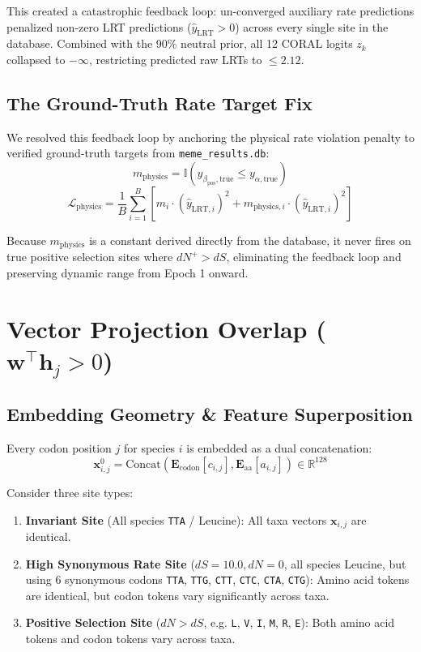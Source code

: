 \documentclass[11pt,a4paper]{article}
\begin{document}
This created a catastrophic feedback loop: un-converged auxiliary rate predictions penalized non-zero LRT predictions ($\hat{y}_{\text{LRT}} > 0$) across every single site in the database. Combined with the 90\% neutral prior, all 12 CORAL logits $z_k$ collapsed to $-\infty$, restricting predicted raw LRTs to $\le 2.12$.

\subsection{The Ground-Truth Rate Target Fix}
We resolved this feedback loop by anchoring the physical rate violation penalty to verified ground-truth targets from \texttt{meme_results.db}:
\begin{equation}
m_{\text{physics}} = \mathbb{I}\left(y_{\beta_{\text{pos}}, \text{true}} \le y_{\alpha, \text{true}}\right)
\end{equation}
\begin{equation}
\mathcal{L}_{\text{physics}} = \frac{1}{B} \sum_{i=1}^B \left[ m_i \cdot (\hat{y}_{\text{LRT}, i})^2 + m_{\text{physics}, i} \cdot (\hat{y}_{\text{LRT}, i})^2 \right]
\end{equation}

Because $m_{\text{physics}}$ is a constant derived directly from the database, it never fires on true positive selection sites where $dN^+ > dS$, eliminating the feedback loop and preserving dynamic range from Epoch 1 onward.

\section{Vector Projection Overlap ($\mathbf{w}^\top \mathbf{h}_j > 0$)}

\subsection{Embedding Geometry & Feature Superposition}
Every codon position $j$ for species $i$ is embedded as a dual concatenation:
\begin{equation}
\mathbf{x}_{i,j}^0 = \text{Concat}\left(\mathbf{E}_{\text{codon}}[c_{i,j}], \mathbf{E}_{\text{aa}}[a_{i,j}]\right) \in \mathbb{R}^{128}
\end{equation}

Consider three site types:
\begin{enumerate}
    \item \textbf{Invariant Site} (All species \texttt{TTA} / Leucine): All taxa vectors $\mathbf{x}_{i,j}$ are identical.
    \item \textbf{High Synonymous Rate Site} ($dS = 10.0, dN = 0$, all species Leucine, but using 6 synonymous codons \texttt{TTA}, \texttt{TTG}, \texttt{CTT}, \texttt{CTC}, \texttt{CTA}, \texttt{CTG}): Amino acid tokens are identical, but codon tokens vary significantly across taxa.
    \item \textbf{Positive Selection Site} ($dN > dS$, e.g. \texttt{L}, \texttt{V}, \texttt{I}, \texttt{M}, \texttt{R}, \texttt{E}): Both amino acid tokens and codon tokens vary across taxa.
\end{enumerate}
\end{document}
